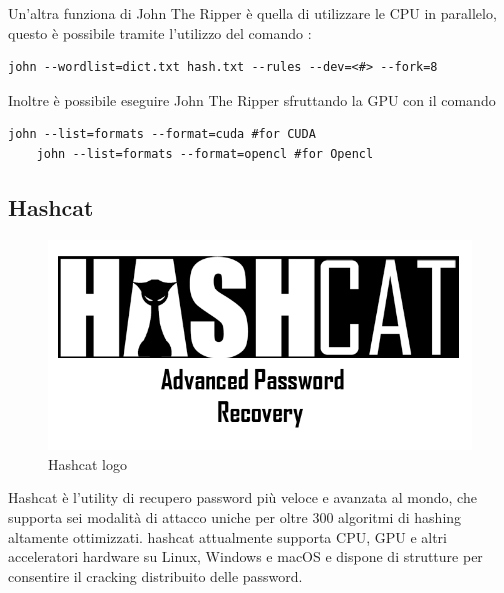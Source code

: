 Un'altra funziona di John The Ripper è quella di utilizzare le CPU in parallelo, questo è possibile tramite l'utilizzo del comando :

\begin{lstlisting}[caption={John the ripper Multi-CPU esempio 8 core}, style=javaScriptCode]
    john --wordlist=dict.txt hash.txt --rules --dev=<#> --fork=8
\end{lstlisting}

Inoltre è possibile eseguire John The Ripper sfruttando la GPU con il comando 
\begin{lstlisting}[caption={John the ripper GPU esempio}, style=javaScriptCode]
    john --list=formats --format=cuda #for CUDA
    john --list=formats --format=opencl #for Opencl\end{lstlisting}
\subsection{Hashcat}

\begin{figure}[htpb!]
    \centering
    \includegraphics[width=\linewidth]{Immagini/1/hashcat-logo.png}
    \caption{Hashcat logo}
\end{figure}

Hashcat \cite{hashcat} è l'utility di recupero password più veloce e avanzata al mondo, che supporta sei modalità di attacco uniche per oltre 300 algoritmi di hashing altamente ottimizzati. hashcat attualmente supporta CPU, GPU e altri acceleratori hardware su Linux, Windows e macOS e dispone di strutture per consentire il cracking distribuito delle password.

